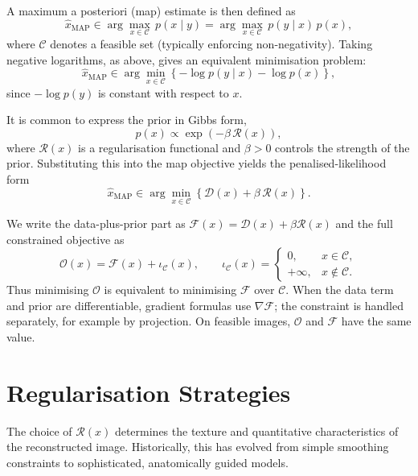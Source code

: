 A maximum a posteriori (\gls{map}) estimate is then defined as
\begin{equation}
\hat{x}_{\mathrm{MAP}} \in \arg\max_{x\in\mathcal{C}} \, p(x\mid y)
= \arg\max_{x\in\mathcal{C}} \, p(y\mid x)\,p(x),
\end{equation}
where $\mathcal{C}$ denotes a feasible set (typically enforcing non-negativity).
Taking negative logarithms, as above, gives an equivalent minimisation problem:
\begin{equation}
\hat{x}_{\mathrm{MAP}} \in \arg\min_{x\in\mathcal{C}}
\left\{-\log p(y\mid x) - \log p(x)\right\},
\end{equation}
since $-\log p(y)$ is constant with respect to $x$.

It is common to express the prior in Gibbs form,
\begin{equation}
p(x) \propto \exp\!\left(-\beta\,\mathcal{R}(x)\right),
\end{equation}
where $\mathcal{R}(x)$ is a regularisation functional and $\beta>0$ controls the strength of the prior. Substituting this into the \gls{map} objective yields the penalised-likelihood form
\begin{equation}
\hat{x}_{\mathrm{MAP}} \in \arg\min_{x\in\mathcal{C}}
\left\{\mathcal{D}(x) + \beta\,\mathcal{R}(x)\right\}.
\end{equation}


We write the data-plus-prior part as $\mathcal F(x)=\mathcal D(x)+\beta\mathcal R(x)$ and the full constrained objective as
\begin{equation}
    \mathcal O(x)=\mathcal F(x)+\iota_{\mathcal C}(x),
    \qquad
    \iota_{\mathcal C}(x)=
    \begin{cases}
        0, & x\in\mathcal C,\\
        +\infty, & x\notin\mathcal C.
    \end{cases}
\end{equation}
Thus minimising $\mathcal O$ is equivalent to minimising $\mathcal F$ over $\mathcal C$. When the data term and prior are differentiable, gradient formulas use $\nabla\mathcal F$; the constraint is handled separately, for example by projection. On feasible images, $\mathcal O$ and $\mathcal F$ have the same value.


\section{Regularisation Strategies}

The choice of $\mathcal{R}(x)$ determines the texture and quantitative characteristics of the reconstructed image. Historically, this has evolved from simple smoothing constraints to sophisticated, anatomically guided models.

